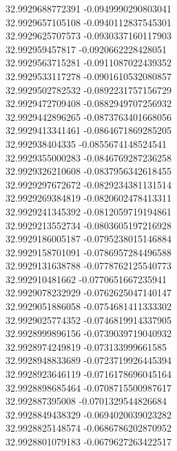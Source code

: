 {32.9929688772391	-0.0949990290803041\\
32.9929657105108	-0.0940112837545301\\
32.9929625707573	-0.0930337160117903\\
32.992959457817	-0.0920662228428051\\
32.9929563715281	-0.0911087022439352\\
32.9929533117278	-0.0901610532080857\\
32.9929502782532	-0.0892231757156729\\
32.9929472709408	-0.0882949707256932\\
32.9929442896265	-0.0873763401668056\\
32.9929413341461	-0.0864671869285205\\
32.992938404335	-0.0855674148524541\\
32.9929355000283	-0.0846769287236258\\
32.9929326210608	-0.0837956342618455\\
32.9929297672672	-0.0829234381131514\\
32.9929269384819	-0.0820602478413311\\
32.9929241345392	-0.0812059719194861\\
32.9929213552734	-0.0803605197216928\\
32.9929186005187	-0.0795238015146884\\
32.9929158701091	-0.0786957284496588\\
32.9929131638788	-0.0778762125540773\\
32.992910481662	-0.0770651667235941\\
32.9929078232929	-0.0762625047140147\\
32.9929051886058	-0.0754681411333302\\
32.9929025774352	-0.0746819914337905\\
32.9928999896156	-0.0739039719040932\\
32.9928974249819	-0.073133999661585\\
32.9928948833689	-0.0723719926445394\\
32.9928923646119	-0.0716178696045164\\
32.9928898685464	-0.0708715500987617\\
32.992887395008	-0.0701329544826684\\
32.9928849438329	-0.0694020039023282\\
32.9928825148574	-0.0686786202870952\\
32.9928801079183	-0.0679627263422517\\
}
